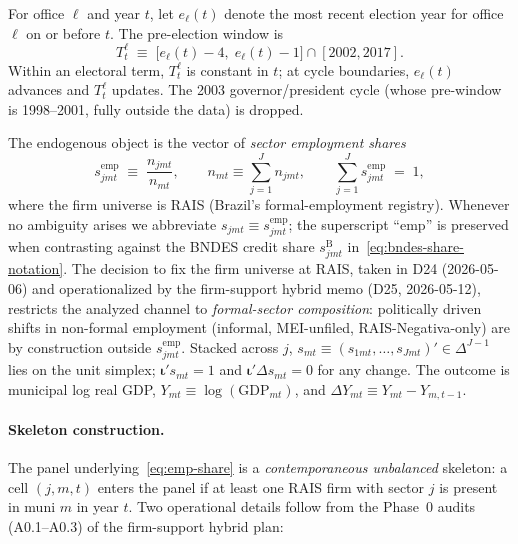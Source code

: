 \documentclass{article}
\newcommand{\iotaVec}{\boldsymbol{\iota}}
\theoremstyle{plain}
\theoremstyle{definition}
\theoremstyle{remark}
\begin{document}
For office $\ell$ and year $t$, let $e_\ell(t)$ denote the most recent election
year for office $\ell$ on or before $t$. The pre-election window is
\begin{equation}\label{eq:window}
  T^{\ell}_{t} \;\equiv\; \big[e_\ell(t)-4,\; e_\ell(t)-1\big] \cap [2002,2017].
\end{equation}
Within an electoral term, $T^{\ell}_t$ is constant in $t$; at cycle boundaries,
$e_\ell(t)$ advances and $T^{\ell}_{t}$ updates. The 2003 governor/president
cycle (whose pre-window is 1998--2001, fully outside the data) is dropped.

The endogenous object is the vector of \emph{sector employment shares}
\begin{equation}\label{eq:emp-share}
  s^{\mathrm{emp}}_{jmt} \;\equiv\; \frac{n_{jmt}}{n_{mt}},
  \qquad
  n_{mt} \equiv \sum_{j=1}^{J} n_{jmt},
  \qquad
  \sum_{j=1}^{J} s^{\mathrm{emp}}_{jmt} \;=\; 1,
\end{equation}
where the firm universe is RAIS (Brazil's formal-employment registry).
Whenever no ambiguity arises we abbreviate $s_{jmt}\equiv s^{\mathrm{emp}}_{jmt}$;
the superscript ``emp'' is preserved when contrasting against the BNDES credit
share $s^{\mathrm{B}}_{jmt}$ in~\eqref{eq:bndes-share-notation}. The decision
to fix the firm universe at RAIS, taken in D24 (2026-05-06) and operationalized
by the firm-support hybrid memo (D25, 2026-05-12), restricts the analyzed
channel to \emph{formal-sector composition}: politically driven shifts in
non-formal employment (informal, MEI-unfiled, RAIS-Negativa-only) are by
construction outside $s^{\mathrm{emp}}_{jmt}$. Stacked across $j$,
$s_{mt}\equiv(s_{1mt},\dots,s_{Jmt})'\in\Delta^{J-1}$ lies on the unit simplex;
$\iotaVec' s_{mt}=1$ and $\iotaVec'\Delta s_{mt}=0$ for any change. The
outcome is municipal log real GDP, $Y_{mt}\equiv\log(\mathrm{GDP}_{mt})$, and
$\Delta Y_{mt}\equiv Y_{mt}-Y_{m,t-1}$.

\paragraph{Skeleton construction.}
The panel underlying~\eqref{eq:emp-share} is a \emph{contemporaneous unbalanced}
skeleton: a cell $(j,m,t)$ enters the panel if at least one RAIS firm with sector
$j$ is present in muni $m$ in year $t$. Two operational details follow from the
Phase~0 audits (A0.1--A0.3) of the firm-support hybrid plan:
\end{document}
